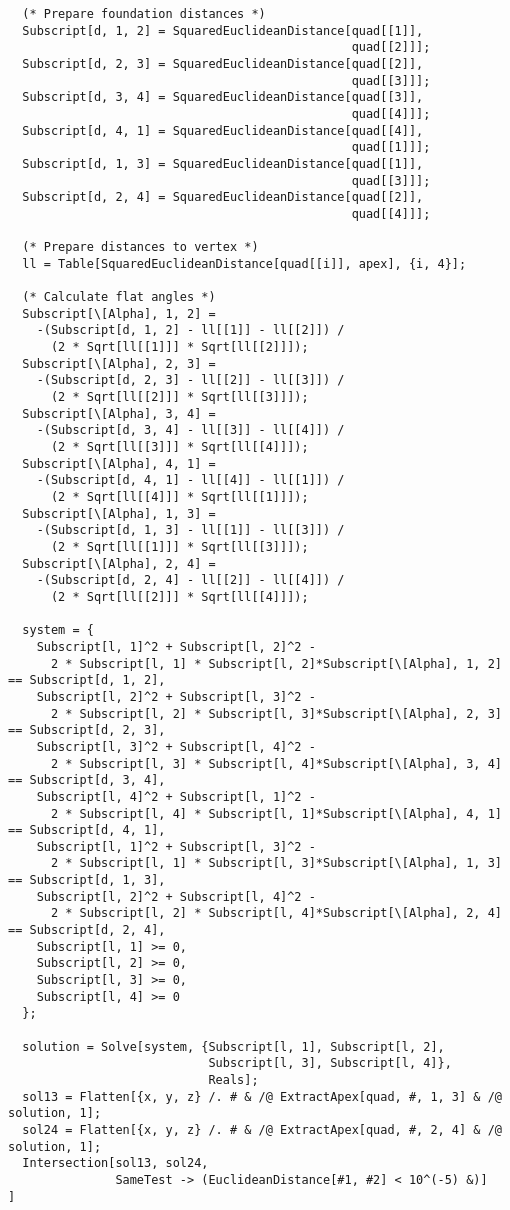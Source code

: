 \documentclass[../main.tex]{subfiles}
\begin{document}
\begin{lstlisting}
  (* Prepare foundation distances *)
  Subscript[d, 1, 2] = SquaredEuclideanDistance[quad[[1]],
                                                quad[[2]]];
  Subscript[d, 2, 3] = SquaredEuclideanDistance[quad[[2]],
                                                quad[[3]]];
  Subscript[d, 3, 4] = SquaredEuclideanDistance[quad[[3]],
                                                quad[[4]]];
  Subscript[d, 4, 1] = SquaredEuclideanDistance[quad[[4]],
                                                quad[[1]]];
  Subscript[d, 1, 3] = SquaredEuclideanDistance[quad[[1]],
                                                quad[[3]]];
  Subscript[d, 2, 4] = SquaredEuclideanDistance[quad[[2]],
                                                quad[[4]]];

  (* Prepare distances to vertex *)
  ll = Table[SquaredEuclideanDistance[quad[[i]], apex], {i, 4}];

  (* Calculate flat angles *)
  Subscript[\[Alpha], 1, 2] =
    -(Subscript[d, 1, 2] - ll[[1]] - ll[[2]]) /
      (2 * Sqrt[ll[[1]]] * Sqrt[ll[[2]]]);
  Subscript[\[Alpha], 2, 3] =
    -(Subscript[d, 2, 3] - ll[[2]] - ll[[3]]) /
      (2 * Sqrt[ll[[2]]] * Sqrt[ll[[3]]]);
  Subscript[\[Alpha], 3, 4] =
    -(Subscript[d, 3, 4] - ll[[3]] - ll[[4]]) /
      (2 * Sqrt[ll[[3]]] * Sqrt[ll[[4]]]);
  Subscript[\[Alpha], 4, 1] =
    -(Subscript[d, 4, 1] - ll[[4]] - ll[[1]]) /
      (2 * Sqrt[ll[[4]]] * Sqrt[ll[[1]]]);
  Subscript[\[Alpha], 1, 3] =
    -(Subscript[d, 1, 3] - ll[[1]] - ll[[3]]) /
      (2 * Sqrt[ll[[1]]] * Sqrt[ll[[3]]]);
  Subscript[\[Alpha], 2, 4] =
    -(Subscript[d, 2, 4] - ll[[2]] - ll[[4]]) /
      (2 * Sqrt[ll[[2]]] * Sqrt[ll[[4]]]);

  system = {
    Subscript[l, 1]^2 + Subscript[l, 2]^2 -
      2 * Subscript[l, 1] * Subscript[l, 2]*Subscript[\[Alpha], 1, 2] == Subscript[d, 1, 2],
    Subscript[l, 2]^2 + Subscript[l, 3]^2 -
      2 * Subscript[l, 2] * Subscript[l, 3]*Subscript[\[Alpha], 2, 3] == Subscript[d, 2, 3],
    Subscript[l, 3]^2 + Subscript[l, 4]^2 -
      2 * Subscript[l, 3] * Subscript[l, 4]*Subscript[\[Alpha], 3, 4] == Subscript[d, 3, 4],
    Subscript[l, 4]^2 + Subscript[l, 1]^2 -
      2 * Subscript[l, 4] * Subscript[l, 1]*Subscript[\[Alpha], 4, 1] == Subscript[d, 4, 1],
    Subscript[l, 1]^2 + Subscript[l, 3]^2 -
      2 * Subscript[l, 1] * Subscript[l, 3]*Subscript[\[Alpha], 1, 3] == Subscript[d, 1, 3],
    Subscript[l, 2]^2 + Subscript[l, 4]^2 -
      2 * Subscript[l, 2] * Subscript[l, 4]*Subscript[\[Alpha], 2, 4] == Subscript[d, 2, 4],
    Subscript[l, 1] >= 0,
    Subscript[l, 2] >= 0,
    Subscript[l, 3] >= 0,
    Subscript[l, 4] >= 0
  };

  solution = Solve[system, {Subscript[l, 1], Subscript[l, 2],
                            Subscript[l, 3], Subscript[l, 4]},
                            Reals];
  sol13 = Flatten[{x, y, z} /. # & /@ ExtractApex[quad, #, 1, 3] & /@ solution, 1];
  sol24 = Flatten[{x, y, z} /. # & /@ ExtractApex[quad, #, 2, 4] & /@ solution, 1];
  Intersection[sol13, sol24,
               SameTest -> (EuclideanDistance[#1, #2] < 10^(-5) &)]
]
\end{lstlisting}
\end{document}
